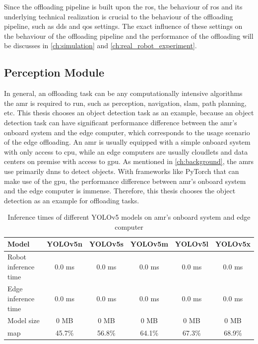 Since the offloading pipeline is built upon the \gls{ros}, the behaviour of \gls{ros} and its underlying technical realization is crucial to the behaviour of the offloading pipeline, such as \gls{dds} and \gls{qos} settings. The exact influence of these settings on the behaviour of the offloading pipeline and the performance of the offloading will be discusses in \cref{ch:simulation} and \cref{ch:real_robot_experiment}. 

\subsection{Perception Module}


In general, an offloading task can be any computationally intensive algorithms the \gls{amr} is required to run, such as perception, navigation, \gls{slam}, path planning, etc. This thesis chooses an object detection task as an example, because an object detection task can have significant performance difference between the \gls{amr}'s onboard system and the edge computer, which corresponds to the usage scenario of the edge offloading. An \gls{amr} is usually equipped with a simple onboard system with only access to \gls{cpu}, while an edge computers are usually cloudlets and data centers on premise with access to \gls{gpu}. As mentioned in \cref{ch:background}, the \glspl{amr} use primarily \glspl{dnn} to detect objects. With frameworks like PyTorch that can make use of the \gls{gpu}, the performance difference between \gls{amr}'s onboard system and the edge computer is immense. Therefore, this thesis chooses the object detection as an example for offloading tasks. 

\begin{table}[htb]%
    \centering%
    \begin{tabular}{lccccc}
        \toprule
        Model &                     YOLOv5n &   YOLOv5s &   YOLOv5m &   YOLOv5l &   YOLOv5x \\
        \midrule
        Robot inference time &      0.0 ms &    0.0 ms &    0.0 ms &    0.0 ms &    0.0 ms  \\
        Edge inference time &       0.0 ms &    0.0 ms &    0.0 ms &    0.0 ms &    0.0 ms  \\
        Model size &                0 MB &      0 MB &      0 MB &      0 MB &      0 MB    \\
        \gls{map} &                 45.7\% &  56.8\% &    64.1\% &    67.3\% &    68.9\%  \\
        \bottomrule
    \end{tabular}
    \caption{Inference times of different YOLOv5 models on \gls{amr}'s onboard system and edge computer}
    \label{tab:inference_time}%
\end{table}

